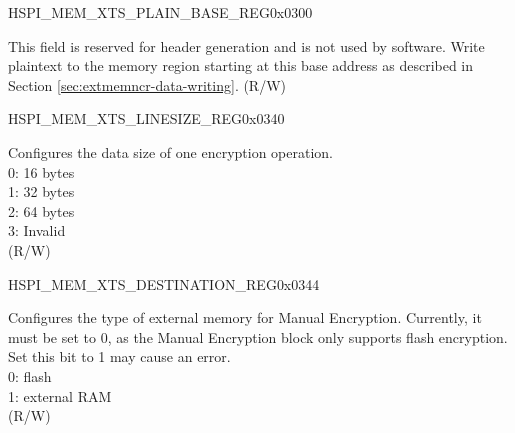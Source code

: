 
\begin{register}{H}{SPI\_MEM\_XTS\_PLAIN\_BASE\_REG}{0x0300}\label{regdesc:SPIMEMXTSPLAINBASEREG}
%
\regnewline%
\begin{regdesc}\begin{reglist}
\label{fielddesc:SPIMEMXTSPLAIN}\item [SPI\_MEM\_XTS\_PLAIN] This field is reserved for header generation and is not used by software. Write plaintext to the memory region starting at this base address as described in Section \ref{sec:extmemncr-data-writing}. (R/W)
\end{reglist}\end{regdesc}
\end{register}


\begin{register}{H}{SPI\_MEM\_XTS\_LINESIZE\_REG}{0x0340}\label{regdesc:SPIMEMXTSLINESIZEREG}
%
%
\regnewline%
\begin{regdesc}\begin{reglist}
\label{fielddesc:SPIMEMXTSLINESIZE}\item [SPI\_MEM\_XTS\_LINESIZE] Configures the data size of one encryption operation. \\
0: 16 bytes\\
1: 32 bytes\\
2: 64 bytes\\
3: Invalid\\
(R/W)
\end{reglist}\end{regdesc}
\end{register}

\begin{register}{H}{SPI\_MEM\_XTS\_DESTINATION\_REG}{0x0344}\label{regdesc:SPIMEMXTSDESTINATIONREG}
%
%
\regnewline%
\begin{regdesc}\begin{reglist}
\label{fielddesc:SPIMEMXTSDESTINATION}\item [SPI\_MEM\_XTS\_DESTINATION] Configures the type of external memory for Manual Encryption. Currently, it must be set to 0, as the Manual Encryption block only supports flash encryption. Set this bit to 1 may cause an error.\\
0: flash\\
1: external RAM\\
(R/W)
\end{reglist}\end{regdesc}
\end{register}


